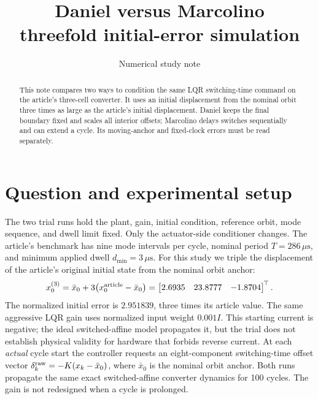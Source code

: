 \documentclass[11pt,a4paper]{article}
\title{Daniel versus Marcolino\\threefold initial-error simulation}
\author{Numerical study note}
\date{}
\begin{document}
\maketitle

\begin{abstract}
This note compares two ways to condition the same LQR switching-time command on the article's three-cell converter. It uses an initial displacement from the nominal orbit three times as large as the article's initial displacement. Daniel keeps the final boundary fixed and scales all interior offsets; Marcolino delays switches sequentially and can extend a cycle. Its moving-anchor and fixed-clock errors must be read separately.
\end{abstract}

\section{Question and experimental setup}

The two trial runs hold the plant, gain, initial condition, reference orbit, mode sequence, and dwell limit fixed. Only the actuator-side conditioner changes. The article's benchmark has nine mode intervals per cycle, nominal period $T=286\,\mu\mathrm{s}$, and minimum applied dwell $d_{\min}=3\,\mu\mathrm{s}$. For this study we triple the displacement of the article's original initial state from the nominal orbit anchor:
\[
 x_0^{(3)}=\bar x_0+3\bigl(x_0^{\rm article}-\bar x_0\bigr)
 =\begin{bmatrix}2.6935&23.8777&-1.8704\end{bmatrix}^{\!\top}.
\]
The normalized initial error is $2.951839$, three times its article value. The same aggressive LQR gain uses normalized input weight $0.001I$. This starting current is negative; the ideal switched-affine model propagates it, but the trial does not establish physical validity for hardware that forbids reverse current. At each \emph{actual} cycle start the controller requests an eight-component switching-time offset vector $\delta^{\rm raw}_k=-K(x_k-\bar x_0)$, where $\bar x_0$ is the nominal orbit anchor. Both runs propagate the same exact switched-affine converter dynamics for 100 cycles. The gain is not redesigned when a cycle is prolonged.
\end{document}
